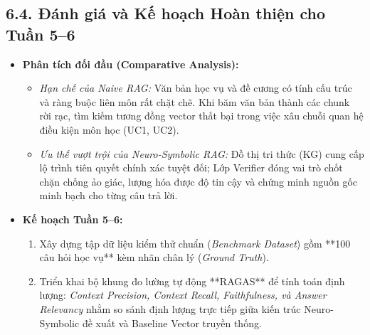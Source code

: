 \documentclass[a4paper,12pt]{article}
\begin{document}
\subsection{6.4. Đánh giá và Kế hoạch Hoàn thiện cho Tuần 5--6}
\begin{itemize}[noitemsep]
    \item \textbf{Phân tích đối đầu (Comparative Analysis):}
    \begin{itemize}[noitemsep]
        \item \textit{Hạn chế của Naive RAG:} Văn bản học vụ và đề cương có tính cấu trúc và ràng buộc liên môn rất chặt chẽ. Khi băm văn bản thành các chunk rời rạc, tìm kiếm tương đồng vector thất bại trong việc xâu chuỗi quan hệ điều kiện môn học (UC1, UC2).
        \item \textit{Ưu thế vượt trội của Neuro-Symbolic RAG:} Đồ thị tri thức (KG) cung cấp lộ trình tiên quyết chính xác tuyệt đối; Lớp Verifier đóng vai trò chốt chặn chống ảo giác, lượng hóa được độ tin cậy và chứng minh nguồn gốc minh bạch cho từng câu trả lời.
    \end{itemize}
    \item \textbf{Kế hoạch Tuần 5--6:}
    \begin{enumerate}[noitemsep]
        \item Xây dựng tập dữ liệu kiểm thử chuẩn (\textit{Benchmark Dataset}) gồm **100 câu hỏi học vụ** kèm nhãn chân lý (\textit{Ground Truth}).
        \item Triển khai bộ khung đo lường tự động **RAGAS** để tính toán định lượng: \textit{Context Precision, Context Recall, Faithfulness, và Answer Relevancy} nhằm so sánh định lượng trực tiếp giữa kiến trúc Neuro-Symbolic đề xuất và Baseline Vector truyền thống.
    \end{enumerate}
\end{itemize}
\end{document}

